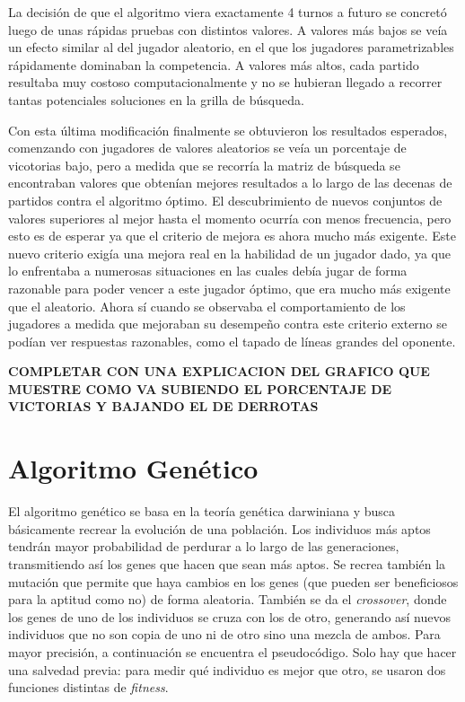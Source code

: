 \documentclass[A4paper,oneside,fleqn,11pt]{article}
\theoremstyle{definition}
\begin{document}
La decisión de que el algoritmo viera exactamente 4 turnos a futuro se concretó luego de unas rápidas pruebas con distintos valores. A valores más bajos se veía un efecto similar al del jugador aleatorio, en el que los jugadores parametrizables rápidamente dominaban la competencia. A valores más altos, cada partido resultaba muy costoso computacionalmente y no se hubieran llegado a recorrer tantas potenciales soluciones en la grilla de búsqueda.


Con esta última modificación finalmente se obtuvieron los resultados esperados, comenzando con jugadores de valores aleatorios se veía un porcentaje de vicotorias bajo, pero a medida que se recorría la matriz de búsqueda se encontraban valores que obtenían mejores resultados a lo largo de las decenas de partidos contra el algoritmo óptimo. El descubrimiento de nuevos conjuntos de valores superiores al mejor hasta el momento ocurría con menos frecuencia, pero esto es de esperar ya que el criterio de mejora es ahora mucho más exigente. Este nuevo criterio exigía una mejora real en la habilidad de un jugador dado, ya que lo enfrentaba a numerosas situaciones en las cuales debía jugar de forma razonable para poder vencer a este jugador óptimo, que era mucho más exigente que el aleatorio. Ahora sí cuando se observaba el comportamiento de los jugadores a medida que mejoraban su desempeño contra este criterio externo se podían ver respuestas razonables, como el tapado de líneas grandes del oponente.



\textbf{COMPLETAR CON UNA EXPLICACION DEL GRAFICO QUE MUESTRE COMO VA SUBIENDO EL PORCENTAJE DE VICTORIAS Y BAJANDO EL DE DERROTAS}











\section{Algoritmo Genético}

El algoritmo genético se basa en la teoría genética darwiniana y busca básicamente recrear la evolución de una población. Los individuos más aptos tendrán mayor probabilidad de perdurar a lo largo de las generaciones, transmitiendo así los genes que hacen que sean más aptos. Se recrea también la mutación que permite que haya cambios en los genes (que pueden ser beneficiosos para la aptitud como no) de forma aleatoria. También se da el \textit{crossover}, donde los genes de uno de los individuos se cruza con los de otro, generando así nuevos individuos que no son copia de uno ni de otro sino una mezcla de ambos. Para mayor precisión, a continuación se encuentra el pseudocódigo. Solo hay que hacer una salvedad previa: para medir qué individuo es mejor que otro, se usaron dos funciones distintas de \textit{fitness}.
\end{document}
